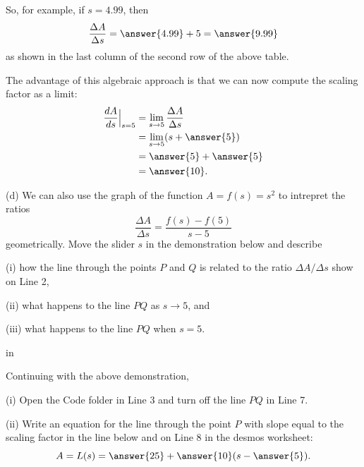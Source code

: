 \documentclass{ximera}
\newcommand{\pskip}{\vskip 0.1 in}
\begin{document}
\begin{question}
So, for example, if $s=4.99$, then
\[
\frac{\Delta A}{\Delta s} = \answer{4.99} + 5 = \answer{9.99} 
\]
as shown in the last column of the second row of the above table.

The advantage of this algebraic approach is that we can now compute the scaling factor as a limit:
\begin{align*}
                    \frac{dA}{ds}\Big|_{s=5} &= \lim_{s\to 5} \frac{\Delta A}{\Delta s} \\
                                                         &=  \lim_{s\to 5} (s+\answer{5}) \\
                                                         &= \answer{5} + \answer{5} \\
                                                           &= \answer{10} .
\end{align*}

(d) We can also use the graph of the function $A=f(s)=s^2$ to intrepret the ratios 
\[
  \frac{\Delta A}{\Delta s} = \frac{f(s) - f(5)}{s-5} 
\]
geometrically. Move the slider $s$ in the demonstration below and describe

(i) how the line through the points $P$ and $Q$ is related to the ratio $\Delta A/\Delta s$ show on Line 2, 

(ii) what happens to the line $PQ$ as $s\to 5$, and

(iii) what happens to the line $PQ$ when $s=5$.

\begin{freeResponse}
\end{freeResponse}

 
\begin{onlineOnly}
    \begin{center}
\end{center}
\end{onlineOnly}

\pskip

Continuing with the above demonstration, 

(i) Open the Code folder in Line 3 and turn off the line $PQ$ in Line 7.

(ii) Write an equation for the line through the point $P$ with slope equal to the scaling factor in the line below and on Line 8 in the desmos worksheet:
\[
    A = L(s) = \answer{25}+ \answer{10}(s- \answer{5}) .
\]


\end{question}
\end{document}
